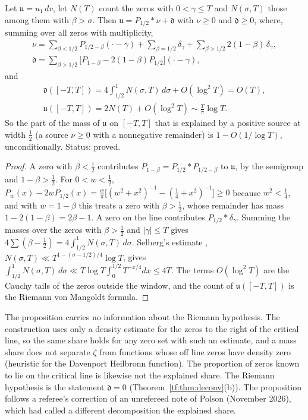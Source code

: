\begin{proposition}\label{cd:prop:share}
Let $\mathfrak u=u_1\,dv$, let $N(T)$ count the zeros with $0<\gamma\le T$ and $N(\sigma,T)$ those among them with $\beta>\sigma$. Then $\mathfrak u=P_{1/2}*\nu+\mathfrak d$ with $\nu\ge0$ and $\mathfrak d\ge0$, where, summing over all zeros with multiplicity,
\begin{gather*}
\nu=\sum_{\beta<1/2}P_{1/2-\beta}(\cdot-\gamma)+\sum_{\beta=1/2}\delta_\gamma+\sum_{\beta>1/2}2(1-\beta)\,\delta_\gamma,\\
\mathfrak d=\sum_{\beta>1/2}\bigl[P_{1-\beta}-2(1-\beta)P_{1/2}\bigr](\cdot-\gamma),
\end{gather*}
and
\begin{gather*}
\mathfrak d([-T,T])=4\int_{1/2}^1N(\sigma,T)\,d\sigma+O(\log^2T)=O(T),\\
\mathfrak u([-T,T])=2N(T)+O(\log^2T)\sim\frac T\pi\log T .
\end{gather*}
So the part of the mass of $\mathfrak u$ on $[-T,T]$ that is explained by a positive source at width $\tfrac12$ (a source $\nu\ge0$ with a nonnegative remainder) is $1-O(1/\log T)$, unconditionally. Status: proved.
\end{proposition}

\begin{proof}
A zero with $\beta<\tfrac12$ contributes $P_{1-\beta}=P_{1/2}*P_{1/2-\beta}$ to $\mathfrak u$, by the semigroup and $1-\beta>\tfrac12$. For $0<w<\tfrac12$, $P_w(x)-2wP_{1/2}(x)=\frac w\pi\bigl[(w^2+x^2)^{-1}-(\tfrac14+x^2)^{-1}\bigr]\ge0$ because $w^2<\tfrac14$, and with $w=1-\beta$ this treats a zero with $\beta>\tfrac12$, whose remainder has mass $1-2(1-\beta)=2\beta-1$. A zero on the line contributes $P_{1/2}*\delta_\gamma$. Summing the masses over the zeros with $\beta>\tfrac12$ and $|\gamma|\le T$ gives $4\sum(\beta-\tfrac12)=4\int_{1/2}^1N(\sigma,T)\,d\sigma$. Selberg's estimate \cite{Selberg46}, $N(\sigma,T)\ll T^{1-(\sigma-1/2)/4}\log T$, gives $\int_{1/2}^1N(\sigma,T)\,d\sigma\ll T\log T\int_0^{1/2}T^{-x/4}dx\le4T$. The terms $O(\log^2T)$ are the Cauchy tails of the zeros outside the window, and the count of $\mathfrak u([-T,T])$ is the Riemann von Mangoldt formula.
\end{proof}

The proposition carries no information about the Riemann hypothesis. The construction uses only a density estimate for the zeros to the right of the critical line, so the same share holds for any zero set with such an estimate, and a mass share does not separate $\zeta$ from functions whose off line zeros have density zero (heuristic for the Davenport Heilbronn function). The proportion of zeros known to lie on the critical line is likewise not the explained share. The Riemann hypothesis is the statement $\mathfrak d=0$ (Theorem~\ref{tf:thm:deconv}(b)). The proposition follows a referee's correction of an unrefereed note of Polson (November 2026), which had called a different decomposition the explained share.

